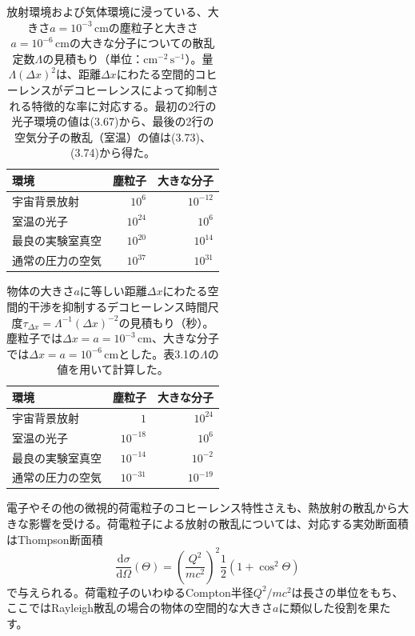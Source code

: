 \hypertarget{srcpage:135}{}\label{srcpage:135}
\begin{table}[htbp]\centering
\caption{放射環境および気体環境に浸っている、大きさ$a=10^{-3}\,\mathrm{cm}$の塵粒子と大きさ$a=10^{-6}\,\mathrm{cm}$の大きな分子についての散乱定数$\Lambda$の見積もり（単位：$\mathrm{cm}^{-2}\,\mathrm s^{-1}$）。量$\Lambda(\Delta x)^2$は、距離$\Delta x$にわたる空間的コヒーレンスがデコヒーレンスによって抑制される特徴的な率に対応する。最初の2行の光子環境の値は(3.67)から、最後の2行の空気分子の散乱（室温）の値は(3.73)、(3.74)から得た。}
\begin{tabular}{lrr}\hline
環境&塵粒子&大きな分子\\\hline
宇宙背景放射&$10^6$&$10^{-12}$\\
室温の光子&$10^{24}$&$10^6$\\
最良の実験室真空&$10^{20}$&$10^{14}$\\
通常の圧力の空気&$10^{37}$&$10^{31}$\\\hline
\end{tabular}\label{tab:3.1}
\end{table}
\begin{table}[htbp]\centering
\caption{物体の大きさ$a$に等しい距離$\Delta x$にわたる空間的干渉を抑制するデコヒーレンス時間尺度$\tau_{\Delta x}=\Lambda^{-1}(\Delta x)^{-2}$の見積もり（秒）。塵粒子では$\Delta x=a=10^{-3}\,\mathrm{cm}$、大きな分子では$\Delta x=a=10^{-6}\,\mathrm{cm}$とした。表3.1の$\Lambda$の値を用いて計算した。}
\begin{tabular}{lrr}\hline
環境&塵粒子&大きな分子\\\hline
宇宙背景放射&$1$&$10^{24}$\\
室温の光子&$10^{-18}$&$10^6$\\
最良の実験室真空&$10^{-14}$&$10^{-2}$\\
通常の圧力の空気&$10^{-31}$&$10^{-19}$\\\hline
\end{tabular}\label{tab:3.2}
\end{table}

電子やその他の微視的荷電粒子のコヒーレンス特性さえも、熱放射の散乱から大きな影響を受ける\cite{ref007,ref166}。荷電粒子による放射の散乱については、対応する実効断面積はThompson断面積
\begin{equation}
\frac{\mathrm d\sigma}{\mathrm d\Omega}(\Theta)=\left(\frac{Q^2}{mc^2}\right)^2\frac12(1+\cos^2\Theta)
\tag{3.68}
\end{equation}
で与えられる。荷電粒子のいわゆるCompton半径$Q^2/mc^2$は長さの単位をもち、ここではRayleigh散乱の場合の物体の空間的な大きさ$a$に類似した役割を果たす。


